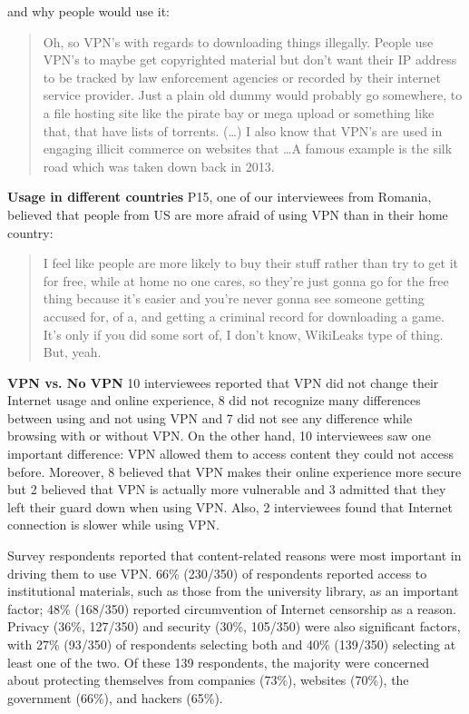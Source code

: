 and why people would use it: \begin{quote}Oh, so VPN's with regards to
downloading things illegally. People use VPN's to maybe get copyrighted
material but don't want their IP address to be tracked by law enforcement
agencies or recorded by their internet service provider. Just a plain old
dummy would probably go somewhere, to a file hosting site like the pirate bay
or mega upload or something like that, that have lists of torrents. (\dots) I
also know that VPN's are used in engaging illicit commerce on websites that
\dots A famous example is the silk road which was taken down back in 2013.
\end{quote}

\textbf{Usage in different countries}
P15, one of our interviewees from Romania, believed that people from US are
more afraid of using VPN than in their home country: \begin{quote}I feel like
people are more likely to buy their stuff rather than try to get it for free,
while at home no one cares, so they're just gonna go for the free thing
because it's easier and you're never gonna see someone getting accused for, of
a, and getting a criminal record for downloading a game. It's only if you did
some sort of, I don't know, WikiLeaks type of thing. But, yeah.\end{quote}

\textbf{VPN vs. No VPN} 10 interviewees reported that VPN did not change their
Internet usage and online experience, 8 did not recognize many differences
between using and not using VPN and 7 did not see any difference while
browsing with or without VPN. On the other hand, 10 interviewees saw one
important difference: VPN allowed them to access content they could not access
before. Moreover, 8 believed that VPN makes their online experience more
secure but 2 believed that VPN is actually more vulnerable and 3 admitted that
they left their guard down when using VPN. Also, 2 interviewees found that
Internet connection is slower while using VPN.

Survey respondents reported that content-related reasons were most important
in driving them to use VPN. 66\% (230/350) of respondents reported access to
institutional materials, such as those from the university library, as an
important factor; 48\% (168/350) reported circumvention of Internet censorship
as a reason. Privacy (36\%, 127/350) and security (30\%, 105/350) were also
significant factors, with 27\% (93/350) of respondents selecting both and 40\%
(139/350) selecting at least one of the two. Of these 139 respondents, the
majority were concerned about protecting themselves from companies (73\%),
websites (70\%), the government (66\%), and hackers (65\%).

